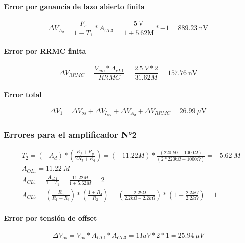 \paragraph{Error por ganancia de lazo abierto finita}
    \begin{equation*}
        \Delta V_{A_d}=\frac{F_s}{1-T_1} * A_{C L 3}=\frac{5 \mathrm{~V}}{1+5.62 \mathrm{M}} *-1=889.23~ \mathrm{nV}
    \end{equation*}
\paragraph{Error por RRMC finita}
    \begin{equation*}
        \Delta V_{R R M C}=\frac{V_{c m} * A_{c L 1}}{R R M C}=\frac{2.5 ~V * 2}{31.62 M}=157.76 ~\mathrm{nV}
    \end{equation*}
\paragraph{Error total}
    \begin{equation*}
        \Delta V_1=\Delta V_{o s}+\Delta V_{I_{p o l}}+\Delta V_{A_d}+\Delta V_{R R M C}=26.99 ~\mu \mathrm{V}
    \end{equation*}
\subsubsection{Errores para el amplificador N°2}
\begin{equation*}
    \begin{aligned}
        &T_2=\left(-A_d\right) *\left(\frac{R_f+R_g}{2 R_f+R_g}\right)=(-11.22 M) * \frac{(220~ k \Omega+1000 \Omega)}{(2 * 220 k \Omega+1000 \Omega)}=-5.62 ~M \\
        &A_{O L 1}=11.22 ~M \\
        &A_{C L 1}=\frac{A_{o L 1}}{1-T_1}=\frac{11.22 M}{1+5.62 M}=2 \\
        &A_{C L 3}=\left(\frac{R_3}{R_1+R_3}\right) *\left(\frac{1+R_4}{R_2}\right)=\left(\frac{2.2 k \Omega}{2.2 k \Omega+2.2 k \Omega}\right) *\left(1+\frac{2.2 k \Omega}{2.2 k \Omega}\right)=1
    \end{aligned}
\end{equation*}
\paragraph{Error por tensión de offset}
    \begin{equation*}
        \Delta V_{o s}=V_{o s} * A_{C L 1} * A_{C L 3}=13 u V * 2 * 1=25.94 ~\mu V
    \end{equation*}
